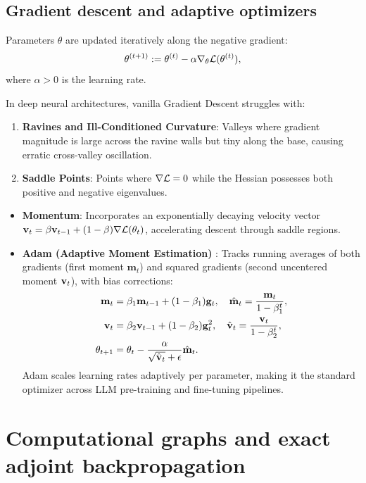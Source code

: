 \documentclass[../../main.tex]{subfiles}
\begin{document}
\subsection{Gradient descent and adaptive optimizers}
Parameters $\theta$ are updated iteratively along the negative gradient:
\begin{equation}
\theta^{(t+1)} := \theta^{(t)} - \alpha \nabla_\theta \mathcal{L}(\theta^{(t)}),
\end{equation}
where $\alpha > 0$ is the learning rate.

In deep neural architectures, vanilla Gradient Descent struggles with:
\begin{enumerate}
    \item \textbf{Ravines and Ill-Conditioned Curvature}: Valleys where gradient magnitude is large across the ravine walls but tiny along the base, causing erratic cross-valley oscillation.
    \item \textbf{Saddle Points}: Points where $\nabla \mathcal{L} = 0$ while the Hessian possesses both positive and negative eigenvalues.
\end{enumerate}

\begin{itemize}
    \item \textbf{Momentum}: Incorporates an exponentially decaying velocity vector $\mathbf{v}_t = \beta \mathbf{v}_{t-1} + (1 - \beta) \nabla \mathcal{L}(\theta_t)$, accelerating descent through saddle regions.
    \item \textbf{Adam (Adaptive Moment Estimation)} \cite{kingma2014adam}: Tracks running averages of both gradients (first moment $\mathbf{m}_t$) and squared gradients (second uncentered moment $\mathbf{v}_t$), with bias corrections:
    \begin{align}
    \mathbf{m}_t &= \beta_1 \mathbf{m}_{t-1} + (1 - \beta_1) \mathbf{g}_t, \quad \hat{\mathbf{m}}_t = \frac{\mathbf{m}_t}{1 - \beta_1^t}, \\
    \mathbf{v}_t &= \beta_2 \mathbf{v}_{t-1} + (1 - \beta_2) \mathbf{g}_t^2, \quad \hat{\mathbf{v}}_t = \frac{\mathbf{v}_t}{1 - \beta_2^t}, \\
    \theta_{t+1} &= \theta_t - \frac{\alpha}{\sqrt{\hat{\mathbf{v}}_t} + \epsilon} \hat{\mathbf{m}}_t.
    \end{align}
    Adam scales learning rates adaptively per parameter, making it the standard optimizer across LLM pre-training and fine-tuning pipelines.
\end{itemize}


\clearpage
\section{Computational graphs and exact adjoint backpropagation}
\label{sec:backprop_computational_graph}
\end{document}
